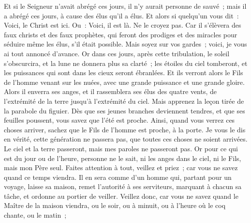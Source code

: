 \begin{multicols}{2}
Et si le Seigneur n'avait abrégé ces jours, il n'y aurait personne de sauvé~; mais il a abrégé ces jours, à cause des élus qu'il a élus.
Et alors si quelqu'un vous dit~: Voici, le Christ est ici. Ou~: Voici, il est là. Ne le croyez pas.
Car il s'élèvera des faux christs et des faux prophètes, qui feront des prodiges et des miracles pour séduire même les élus, s'il était possible.
Mais soyez sur vos gardes~; voici, je vous ai tout annoncé d'avance.
Or dans ces jours, après cette tribulation, le soleil s'obscurcira, et la lune ne donnera plus sa clarté~;
les étoiles du ciel tomberont, et les puissances qui sont dans les cieux seront ébranlées.
Et ils verront alors le Fils de l'homme venant sur les nuées, avec une grande puissance et une grande gloire.
Alors il enverra ses anges, et il rassemblera ses élus des quatre vents, de l'extrémité de la terre jusqu'à l'extrémité du ciel.
Mais apprenez la leçon tirée de la parabole du figuier. Dès que ses jeunes branches deviennent tendres, et que ses feuilles poussent, vous savez que l'été est proche.
Ainsi, quand vous verrez ces choses arriver, sachez que le Fils de l'homme est proche, à la porte.
Je vous le dis en vérité, cette génération ne passera pas, que toutes ces choses ne soient arrivées.
Le ciel et la terre passeront, mais mes paroles ne passeront pas.
Or pour ce qui est du jour ou de l'heure, personne ne le sait, ni les anges dans le ciel, ni le Fils, mais mon Père seul.
Faites attention à tout, veillez et priez~; car vous ne savez quand ce temps viendra.
Il en sera comme d'un homme qui, partant pour un voyage, laisse sa maison, remet l'autorité à ses serviteurs, marquant à chacun sa tâche, et ordonne au portier de veiller.
Veillez donc, car vous ne savez quand le Maître de la maison viendra, ou le soir, ou à minuit, ou à l'heure où le coq chante, ou le matin~;

\end{multicols}
